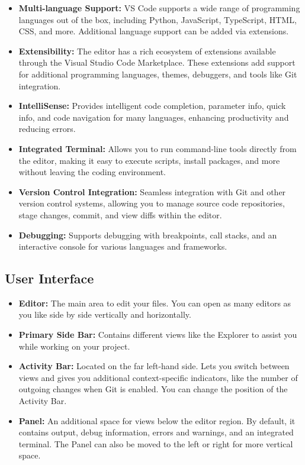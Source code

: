 \documentclass[
  letterpaper,
  DIV=11,
  numbers=noendperiod]{scrreprt}
\providecommand{\tightlist}{%
  \setlength{\itemsep}{0pt}\setlength{\parskip}{0pt}}\usepackage{longtable,booktabs,array}
\begin{document}
\begin{itemize}
\tightlist
\item
  \textbf{Multi-language Support:} VS Code supports a wide range of
  programming languages out of the box, including Python, JavaScript,
  TypeScript, HTML, CSS, and more. Additional language support can be
  added via extensions.
\item
  \textbf{Extensibility:} The editor has a rich ecosystem of extensions
  available through the Visual Studio Code Marketplace. These extensions
  add support for additional programming languages, themes, debuggers,
  and tools like Git integration.
\item
  \textbf{IntelliSense:} Provides intelligent code completion, parameter
  info, quick info, and code navigation for many languages, enhancing
  productivity and reducing errors.
\item
  \textbf{Integrated Terminal:} Allows you to run command-line tools
  directly from the editor, making it easy to execute scripts, install
  packages, and more without leaving the coding environment.
\item
  \textbf{Version Control Integration:} Seamless integration with Git
  and other version control systems, allowing you to manage source code
  repositories, stage changes, commit, and view diffs within the editor.
\item
  \textbf{Debugging:} Supports debugging with breakpoints, call stacks,
  and an interactive console for various languages and frameworks.
\end{itemize}

\hypertarget{user-interface}{%
\subsection{User Interface}\label{user-interface}}

\begin{itemize}
\tightlist
\item
  \textbf{Editor:} The main area to edit your files. You can open as
  many editors as you like side by side vertically and horizontally.
\item
  \textbf{Primary Side Bar:} Contains different views like the Explorer
  to assist you while working on your project.
\item
  \textbf{Activity Bar:} Located on the far left-hand side. Lets you
  switch between views and gives you additional context-specific
  indicators, like the number of outgoing changes when Git is enabled.
  You can change the position of the Activity Bar.
\item
  \textbf{Panel:} An additional space for views below the editor region.
  By default, it contains output, debug information, errors and
  warnings, and an integrated terminal. The Panel can also be moved to
  the left or right for more vertical space.
\end{itemize}
\end{document}
